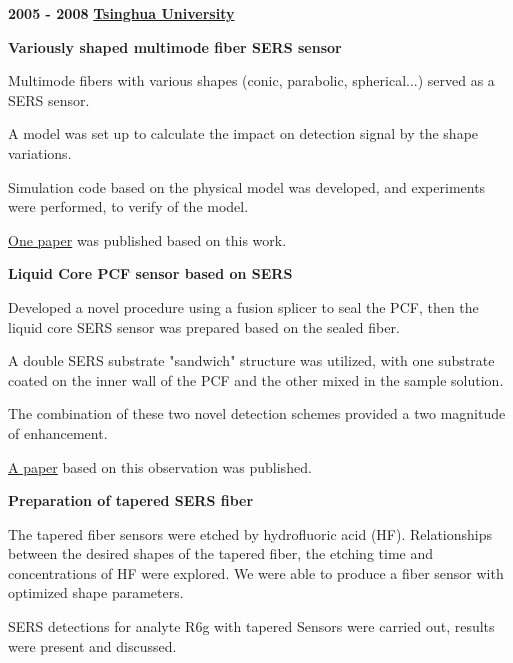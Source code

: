 \documentclass[10pt]{article}
\newenvironment{outerlist}[1][\enskip\textbullet]%
        {\begin{enumerate}[#1]}{\end{enumerate}%
         \vspace{-.6\baselineskip}}
\newenvironment{innerlist}[1][\enskip\textbullet]%
        {\begin{compactenum}[#1]}{\end{compactenum}}
\begin{document}
\textbf{2005 - 2008} \hfill \href{http://www.tsinghua.edu.cn}{\textbf{Tsinghua University}}
\begin{outerlist}
\item[] \textbf{Variously shaped multimode fiber SERS sensor}
        \begin{innerlist}
        \item Multimode fibers with various shapes (conic, parabolic, spherical...) served as a SERS sensor.
        \item A model was set up to calculate the impact on detection signal by the shape variations.
        \item Simulation code based on the physical model was developed, and experiments were performed, to verify of the model.
        \item \href{http://spie.org/x648.xml?product_id=791756&Search_Origin=QuickSearch&Search_Results_URL=http://spie.org/x1636.xml&Alternate_URL=http://spie.org/x18509.xml&Alternate_URL_Name=timeframe&Alternate_URL_Value=Exhibitors&UseJavascript=1&Please_Wait_URL=http://spie.org/x18503.xml&search_text=chao%20lu&category=All&go=submit}{One paper} was published based on this work.
        \end{innerlist}


\item[] \textbf{Liquid Core PCF sensor based on SERS}
        \begin{innerlist}
        \item Developed a novel procedure using a fusion splicer to seal the PCF, then the liquid core SERS sensor was prepared based on the sealed fiber.
        \item A double SERS substrate "sandwich" structure was utilized, with one substrate coated on the inner wall of the PCF and the other mixed in the sample solution.
        \item The combination of these two novel detection schemes provided a two magnitude of enhancement.
        \item \href{http://apl.aip.org/resource/1/applab/v93/i15/p153101_s1}{A paper} based on this observation was published.
        \end{innerlist}

\item[] \textbf{Preparation of tapered SERS fiber}
        \begin{innerlist}
          \item The tapered fiber sensors were etched by hydrofluoric acid (HF). Relationships between the desired shapes of the tapered fiber, the etching time and concentrations of HF were explored. We were able to produce a fiber sensor with optimized shape parameters. 
          \item SERS detections for analyte R6g with tapered Sensors were carried out, results were present and discussed.
        \end{innerlist}


\end{outerlist}
\end{document}
